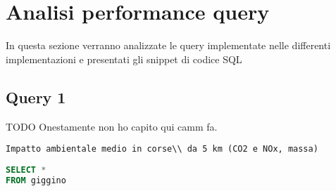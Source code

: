 \section{Analisi performance query}
In questa sezione verranno analizzate le query implementate nelle differenti implementazioni e presentati gli snippet di codice SQL

\subsection{Query 1}
TODO Onestamente non ho capito qui camm fa.
\begin{verbatim}
Impatto ambientale medio in corse\\ da 5 km (CO2 e NOx, massa)
\end{verbatim}
\begin{lstlisting}[language=SQL]
SELECT *
FROM giggino
\end{lstlisting}

